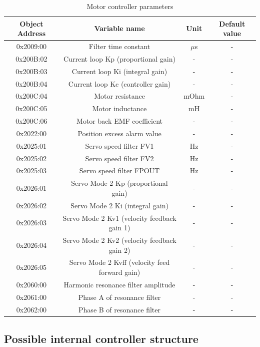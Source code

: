 \begin{table}[H]
	\centering
	\begin{tabular}{|c|c|c|c|}
		\hline
		\textbf{Object Address} & \textbf{Variable name} & \textbf{Unit} & \textbf{Default value} \\
		\hline
		0x2009:00 & Filter time constant & $\mu$s & - \\
		\hline
		0x200B:02 & Current loop Kp (proportional gain) & - & - \\
		\hline
		0x200B:03 & Current loop Ki (integral gain) & - & - \\
		\hline
		0x200B:04 & Current loop Kc (controller gain) & - & - \\
		\hline
		0x200C:04 & Motor resistance & mOhm & - \\
		\hline
		0x200C:05 & Motor inductance & mH & - \\
		\hline
		0x200C:06 & Motor back EMF coefficient & - & - \\
		\hline
		0x2022:00 & Position excess alarm value & - & - \\
		\hline
		0x2025:01 & Servo speed filter FV1 & Hz & - \\
		\hline
		0x2025:02 & Servo speed filter FV2 & Hz & - \\
		\hline
		0x2025:03 & Servo speed filter FPOUT & Hz & - \\
		\hline
		0x2026:01 & Servo Mode 2 Kp (proportional gain) & - & - \\
		\hline
		0x2026:02 & Servo Mode 2 Ki (integral gain) & - & - \\
		\hline
		0x2026:03 & Servo Mode 2 Kv1 (velocity feedback gain 1) & - & - \\
		\hline
		0x2026:04 & Servo Mode 2 Kv2 (velocity feedback gain 2) & - & - \\
		\hline
		0x2026:05 & Servo Mode 2 Kvff (velocity feed forward gain) & - & - \\
		\hline
		0x2060:00 & Harmonic resonance filter amplitude & - & - \\
		\hline
		0x2061:00 & Phase A of resonance filter & - & - \\
		\hline
		0x2062:00 & Phase B of resonance filter & - & - \\
		\hline
	\end{tabular}
	\caption{Motor controller parameters}
	\label{tab:controller_parameters}
\end{table}

\subsection{Possible internal controller structure}

